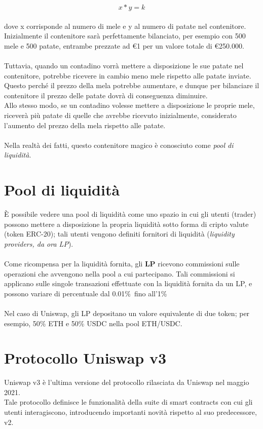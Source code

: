 \documentclass{report}
\begin{document}
\[ x * y = k \]
\\dove x corrisponde al numero di mele e y al numero di patate nel contenitore.
\\Inizialmente il contenitore sarà perfettamente bilanciato, per esempio con 500 mele e 500 patate, entrambe prezzate ad €1 per un valore totale di €250.000.
\\\\Tuttavia, quando un contadino vorrà mettere a disposizione le sue patate nel contenitore, potrebbe ricevere in cambio meno mele rispetto alle patate inviate.
Questo perché il prezzo della mela potrebbe aumentare, e dunque per bilanciare il contenitore il prezzo delle patate dovrà di conseguenza diminuire.
\\Allo stesso modo, se un contadino volesse mettere a disposizione le proprie mele, riceverà più patate di quelle che avrebbe ricevuto inizialmente, considerato l'aumento del prezzo della mela rispetto alle patate.
\\\\Nella realtà dei fatti, questo contenitore magico è conosciuto come \textit{pool di liquidità}.

\section{Pool di liquidità}

È possibile vedere una pool di liquidità come uno spazio in cui gli utenti (trader) possono mettere a disposizione la propria liquidità sotto forma di cripto valute (token ERC-20\cite{erc_20}); tali utenti vengono definiti fornitori di liquidità (\textit{liquidity providers, da ora LP}).
\\\\Come ricompensa per la liquidità fornita, gli \textbf{LP} ricevono commissioni sulle operazioni che avvengono nella pool a cui partecipano. 
Tali commissioni si applicano sulle singole transazioni effettuate con la liquidità fornita da un LP, e possono variare di percentuale dal 0.01\%\ fino all'1\%\.\\\\Nel caso di Uniswap, gli LP depositano un valore equivalente di due token; per esempio, 50\% ETH e 50\% USDC nella pool ETH/USDC.


\section{Protocollo Uniswap v3}

Uniswap v3 è l'ultima versione del protocollo rilasciata da Uniswap nel maggio 2021.\\ Tale protocollo definisce le funzionalità della suite di smart contracts con cui gli utenti interagiscono, introducendo importanti novità rispetto al suo predecessore, v2.
\end{document}
